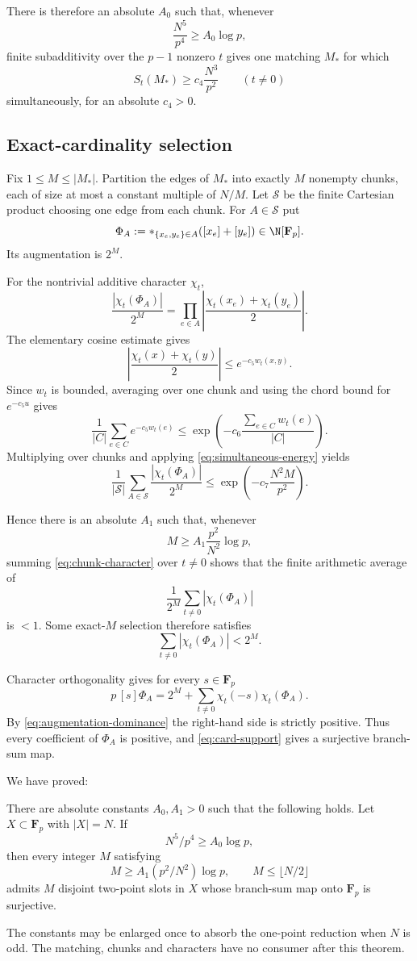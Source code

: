 There is therefore an absolute $A_0$ such that, whenever
\[
\frac{N^5}{p^4}\ge A_0\log p,
\tag{AC4}\label{eq:matching-threshold}
\]
finite subadditivity over the $p-1$ nonzero $t$ gives one matching $M_*$ for
which
\[
S_t(M_*)\ge c_4\frac{N^3}{p^2}
\qquad(t\ne0)
\tag{AC5}\label{eq:simultaneous-energy}
\]
simultaneously, for an absolute $c_4>0$.

\subsection{Exact-cardinality selection}

Fix $1\le M\le|M_*|$.  Partition the edges of $M_*$ into exactly $M$ nonempty
chunks, each of size at most a constant multiple of $N/M$.  Let $\mathcal S$
be the finite Cartesian product choosing one edge from each chunk.  For
$A\in\mathcal S$ put
\[
\Phi_A:=*_{\{x_e,y_e\}\in A}([x_e]+[y_e])
\in\N[\mathbf F_p].
\]
Its augmentation is $2^M$.

For the nontrivial additive character $\chi_t$,
\[
\frac{|\chi_t(\Phi_A)|}{2^M}
=
\prod_{e\in A}
\left|\frac{\chi_t(x_e)+\chi_t(y_e)}2\right|.
\]
The elementary cosine estimate gives
\[
\left|\frac{\chi_t(x)+\chi_t(y)}2\right|
\le e^{-c_5w_t(x,y)}.
\]
Since $w_t$ is bounded, averaging over one chunk and using the chord bound for
$e^{-c_5u}$ gives
\[
\frac1{|C|}\sum_{e\in C}e^{-c_5w_t(e)}
\le
\exp\!\left(-c_6\frac{\sum_{e\in C}w_t(e)}{|C|}\right).
\]
Multiplying over chunks and applying \eqref{eq:simultaneous-energy} yields
\[
\frac1{|\mathcal S|}\sum_{A\in\mathcal S}
\frac{|\chi_t(\Phi_A)|}{2^M}
\le
\exp\!\left(-c_7\frac{N^2M}{p^2}\right).
\tag{AC6}\label{eq:chunk-character}
\]

Hence there is an absolute $A_1$ such that, whenever
\[
M\ge A_1\frac{p^2}{N^2}\log p,
\tag{AC7}\label{eq:atomic-threshold}
\]
summing \eqref{eq:chunk-character} over $t\ne0$ shows that the finite
arithmetic average of
\[
\frac1{2^M}\sum_{t\ne0}|\chi_t(\Phi_A)|
\]
is $<1$.  Some exact-$M$ selection therefore satisfies
\[
\sum_{t\ne0}|\chi_t(\Phi_A)|<2^M.
\tag{AC8}\label{eq:augmentation-dominance}
\]

Character orthogonality gives for every $s\in\mathbf F_p$
\[
p\,[s]\Phi_A
=2^M+
\sum_{t\ne0}\chi_t(-s)\chi_t(\Phi_A).
\]
By \eqref{eq:augmentation-dominance} the right-hand side is strictly positive.
Thus every coefficient of $\Phi_A$ is positive, and
\eqref{eq:card-support} gives a surjective branch-sum map.

We have proved:

\begin{theorem}\label{thm:atomic-convolution}
There are absolute constants $A_0,A_1>0$ such that the following holds.  Let
$X\subset\mathbf F_p$ with $|X|=N$.  If
\[
N^5/p^4\ge A_0\log p,
\]
then every integer $M$ satisfying
\[
M\ge A_1(p^2/N^2)\log p,
\qquad M\le\lfloor N/2\rfloor
\]
admits $M$ disjoint two-point slots in $X$ whose branch-sum map onto
$\mathbf F_p$ is surjective.
\end{theorem}

The constants may be enlarged once to absorb the one-point reduction when
$N$ is odd.  The matching, chunks and characters have no consumer after this
theorem.
